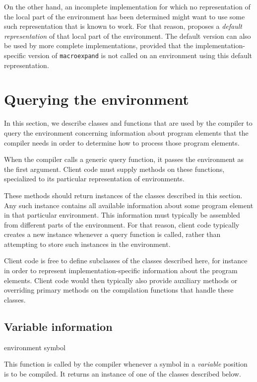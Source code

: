 On the other hand, an incomplete implementation for which no
representation of the local part of the environment has been
determined might want to use some such representation that is known to
work.  For that reason, \sysname{} proposes a \emph{default
  representation} of that local part of the environment.  The default
version can also be used by more complete implementations, provided
that the implementation-specific version of \texttt{macroexpand} is
not called on an environment using this default representation. 

\section{Querying the environment}

In this section, we describe classes and functions that are used by
the compiler to query the environment concerning information about
program elements that the compiler needs in order to determine how to
process those program elements. 

When the compiler calls a generic query function, it passes the
environment as the first argument.  Client code must supply methods
on these functions, specialized to its particular representation of
environments. 

These methods should return instances of the classes described in this
section.  Any such instance contains all available information about
some program element in that particular environment.  This information
must typically be assembled from different parts of the environment.
For that reason, client code typically creates a new instance whenever
a query function is called, rather than attempting to store such
instances in the environment. 

Client code is free to define subclasses of the classes described
here, for instance in order to represent implementation-specific
information about the program elements.  Client code would then
typically also provide auxiliary methods or overriding primary methods
on the compilation functions that handle these classes.

\subsection{Variable information}

 {environment symbol}

This function is called by the compiler whenever a symbol in a
\emph{variable} position is to be compiled.  It returns an instance of
one of the classes described below.

